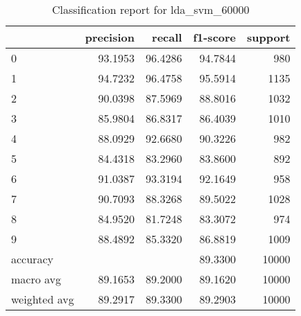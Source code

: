 \begin{table}[htb!]
\centering
\begin{tabular}{lrrrr}
    \toprule
    & precision & recall & f1-score & support \\
    \midrule
0 & 93.1953 & 96.4286 & 94.7844 & 980 \\
1 & 94.7232 & 96.4758 & 95.5914 & 1135 \\
2 & 90.0398 & 87.5969 & 88.8016 & 1032 \\
3 & 85.9804 & 86.8317 & 86.4039 & 1010 \\
4 & 88.0929 & 92.6680 & 90.3226 & 982 \\
5 & 84.4318 & 83.2960 & 83.8600 & 892 \\
6 & 91.0387 & 93.3194 & 92.1649 & 958 \\
7 & 90.7093 & 88.3268 & 89.5022 & 1028 \\
8 & 84.9520 & 81.7248 & 83.3072 & 974 \\
9 & 88.4892 & 85.3320 & 86.8819 & 1009 \\
accuracy & & & 89.3300 & 10000 \\
macro avg & 89.1653 & 89.2000 & 89.1620 & 10000 \\
weighted avg & 89.2917 & 89.3300 & 89.2903 & 10000 \\
\bottomrule
\end{tabular}
\caption{Classification report for lda\_svm\_60000}
\label{tab:classification-report-lda_svm_60000}
\end{table}
